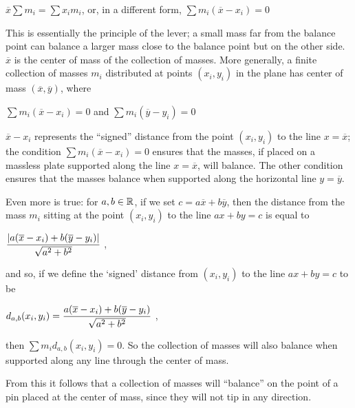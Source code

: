 \smallskip

\centerline{$\overline{x}\sum m_i = \sum x_im_i$, 
or, in a different form, $\sum m_i(\overline{x}-x_i)=0$}

\smallskip

\noindent This is essentially the principle of the lever; a small mass far from
the balance point can balance a larger mass close to the balance point but on the 
other side. $\overline{x}$ is the center of mass of the collection of masses.
More generally, a finite collection of masses $m_i$ distributed at points $(x_i,y_i)$
in the plane has
center of mass $(\overline{x},\overline{y})$, where 

\smallskip

\centerline{$\sum m_i(\overline{x}-x_i)=0$ and  $\sum m_i(\overline{y}-y_i)=0$}

\smallskip

$\overline{x}-x_i$ represents the ``signed'' distance from the point $(x_i,y_i)$
to the line $x=\overline{x}$; the condition $\sum m_i(\overline{x}-x_i)=0$ ensures
that the masses, if placed on a massless plate supported along the line 
$x=\overline{x}$, will balance. The other condition ensures that the masses 
balance when supported along the horizontal line $y=\overline{y}$.

\medskip

Even more is true: 
for $a,b\in{\Bbb R}$, if we set $c=a\overline{x}+b\overline{y}$,
then the distance from the mass $m_i$ sitting at the 
point $(x_i,y_i)$ to the line $ax+by=c$ is equal to 

\smallskip

\centerline{$\displaystyle {{|a(\overline{x}-x_i)+b(\overline{y}-y_i)|}\over{\sqrt{a^2+b^2}}}$ ,}

\smallskip

\noindent and so, if we define the `signed' distance from $(x_i,y_i)$
to the line $ax+by=c$ to be 

\smallskip

\centerline{$\displaystyle d_{a,b}(x_i,y_i) = {{a(\overline{x}-x_i)+b(\overline{y}-y_i)}\over{\sqrt{a^2+b^2}}}$ ,}

then $\sum m_id_{a,b}(x_i,y_i)=0$. So the collection of masses will also
balance when supported along any line through the center of mass.

\medskip

From this it follows that a collection of masses will ``balance'' on the point of a pin placed
at the center of mass, since they will not tip in any direction.

